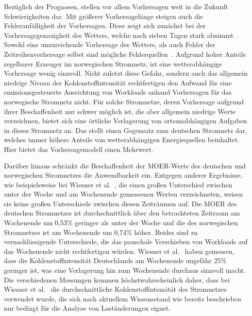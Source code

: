 Bezüglich der Prognosen, stellen vor allem Vorhersagen weit in die Zukunft Schwierigkeiten dar.
Mit größerer Vorhersagelänge steigen auch die Fehleranfälligkeit der Vorhersagen.
Diese zeigt sich zunächst bei der Vorhersagegenauigkeit des Wetters, welche nach sieben Tagen stark abnimmt~\cite{Lam.2022}.
Sowohl eine unzureichende Vorhersage des Wetters, als auch Fehler der Zeitreihenvorhersage selbst sind mögliche Fehlerquellen~\cite{Wiesner.2021}.
Aufgrund hoher Anteile regelbarer Erzeuger im norwegischen Stromnetz, ist eine wetterabhängige Vorhersage wenig sinnvoll.
Nicht zuletzt diese Gefahr, sondern auch das allgemein niedrige Niveau der Kohlenstoffintensität rechtfertigen den Aufwand für eine emissionsgesteuerte Ausrichtung von Workloads anhand Vorhersagen für das norwegische Stromnetz nicht.
Für solche Stromnetze, deren Vorhersage aufgrund ihrer Beschaffenheit nur schwer möglich ist, die aber allgemein niedrige Werte verzeichnen, bietet sich eine örtliche Verlagerung von ortsunabhängigen Aufgaben in dieses Stromnetz an.
Das stellt einen Gegensatz zum deutschen Stromnetz dar, welches immer höhere Anteile von wetterabhängigen Energiequellen beinhaltet.
Hier bietet das Vorhersagemodell einen Mehrwert.

Darüber hinaus schränkt die Beschaffenheit der \ac{MOER}-Werte des deutschen und norwegischen Stromnetzes die Anwendbarkeit ein.
Entgegen anderer Ergebnisse, wie beispielsweise bei Wiesner et al.~\cite{Wiesner.2021}, die einen großen Unterschied zwischen unter der Woche und am Wochenende gemessenen Werten verzeichneten, weisen sie keine großen Unterschiede zwischen diesen Zeiträumen auf.
Die \ac{MOER} des deutschen Stromnetzes ist durchschnittlich über den betrachteten Zeitraum am Wochenende um 0,53\% geringer als unter der Woche und die des norwegischen Stromnetzes ist am Wochenende um 0,74\% höher.
Beides sind zu vernachlässigende Unterschiede, die das pauschale Verschieben von Workloads auf das Wochenende nicht rechtfertigen würden.
Wiesner et al.~\cite{Wiesner.2021} haben gemessen, dass die Kohlenstoffintensität Deutschlands am Wochenende ungefähr 25\% geringer ist, was eine Verlagerung hin zum Wochenende durchaus sinnvoll macht.
Die verschiedenen Messungen kommen höchstwahrscheinlich daher, dass bei Wiesner et al.~\cite{Wiesner.2021} die durchschnittliche Kohlenstoffintensität des Stromnetzes verwendet wurde, die sich nach aktuellem Wissensstand wie bereits beschrieben nur bedingt für die Analyse von Laständerungen eignet.

